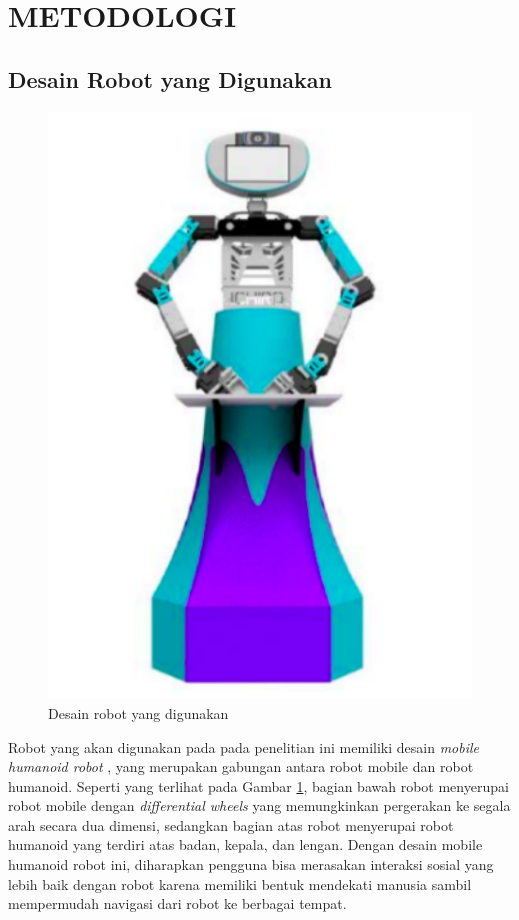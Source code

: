 \section{METODOLOGI}

\subsection{Desain Robot yang Digunakan}

\begin{figure} [ht] \centering
	\includegraphics[scale=0.45]{gambar/robot-design.png}
	\caption{Desain robot yang digunakan}
	\label{fig:RobotDesign}
\end{figure}

Robot yang akan digunakan pada pada penelitian ini memiliki desain \emph{mobile humanoid robot} \citep{Mohamed2012}, yang merupakan gabungan antara robot mobile dan robot humanoid.
Seperti yang terlihat pada Gambar \ref{fig:RobotDesign}, bagian bawah robot menyerupai robot mobile dengan \emph{differential wheels} yang memungkinkan pergerakan ke segala arah secara dua dimensi, sedangkan bagian atas robot menyerupai robot humanoid yang terdiri atas badan, kepala, dan lengan.
Dengan desain mobile humanoid robot ini, diharapkan pengguna bisa merasakan interaksi sosial yang lebih baik dengan robot karena memiliki bentuk mendekati manusia \citep{Rossi2018} sambil mempermudah navigasi dari robot ke berbagai tempat.

